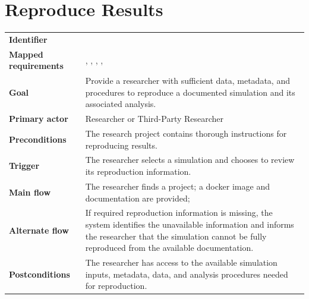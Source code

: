 \section{Reproduce Results}
\begin{tabularx}{\linewidth}{L{3.5cm}Y}
\toprule
\textbf{Identifier} & \\
\textbf{Mapped requirements} & , , , , \\
\textbf{Goal} & Provide a researcher with sufficient data, metadata, and procedures to reproduce a documented simulation and its associated analysis.\\
\textbf{Primary actor} & Researcher or Third-Party Researcher\\
\textbf{Preconditions} & The research project contains thorough instructions for reproducing results. \\
\textbf{Trigger} & The researcher selects a simulation and chooses to review its reproduction information.\\
\textbf{Main flow} & The researcher finds a project; a docker image and documentation are provided;\\
\textbf{Alternate flow} & If required reproduction information is missing, the system identifies the unavailable information and informs the researcher that the simulation cannot be fully reproduced from the available documentation.\\
\textbf{Postconditions} & The researcher has access to the available simulation inputs, metadata, data, and analysis procedures needed for reproduction.\\
\bottomrule
\end{tabularx}



